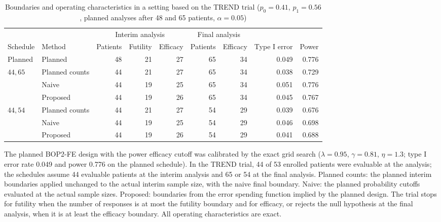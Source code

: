 \begin{table}
\centering
\caption{Boundaries and operating characteristics in a setting based on the TREND trial ($p_0 = 0.41$, $p_1 = 0.56$, planned analyses after 48 and 65 patients, $\alpha = 0.05$)}
\label{tab:trend}
\scriptsize
\setlength{\tabcolsep}{3pt}
\begin{tabular}{llrrrrrrr}
\toprule
 & & \multicolumn{3}{c}{Interim analysis} & \multicolumn{2}{c}{Final analysis} & & \\
\cmidrule(lr){3-5}\cmidrule(lr){6-7}
Schedule & Method & Patients & Futility & Efficacy & Patients & Efficacy & Type I error & Power \\
\midrule
Planned & Planned & 48 & 21 & 27 & 65 & 34 & 0.049 & 0.776 \\
\midrule
$44, 65$ & Planned counts & 44 & 21 & 27 & 65 & 34 & 0.038 & 0.729 \\
 & Naive & 44 & 19 & 25 & 65 & 34 & 0.051 & 0.776 \\
 & Proposed & 44 & 19 & 26 & 65 & 34 & 0.045 & 0.767 \\
\midrule
$44, 54$ & Planned counts & 44 & 21 & 27 & 54 & 29 & 0.039 & 0.676 \\
 & Naive & 44 & 19 & 25 & 54 & 29 & 0.046 & 0.698 \\
 & Proposed & 44 & 19 & 26 & 54 & 29 & 0.041 & 0.688 \\
\bottomrule
\end{tabular}
\par\medskip
\begin{minipage}{0.95\textwidth}
\footnotesize
The planned BOP2-FE design with the power efficacy cutoff was calibrated by the exact grid search ($\lambda = 0.95$, $\gamma = 0.81$, $\eta = 1.3$; type I error rate 0.049 and power 0.776 on the planned schedule). In the TREND trial, 44 of 53 enrolled patients were evaluable at the analysis; the schedules assume 44 evaluable patients at the interim analysis and 65 or 54 at the final analysis. Planned counts: the planned interim boundaries applied unchanged to the actual interim sample size, with the naive final boundary. Naive: the planned probability cutoffs evaluated at the actual sample sizes. Proposed: boundaries from the error spending function implied by the planned design. The trial stops for futility when the number of responses is at most the futility boundary and for efficacy, or rejects the null hypothesis at the final analysis, when it is at least the efficacy boundary. All operating characteristics are exact.
\end{minipage}
\end{table}
